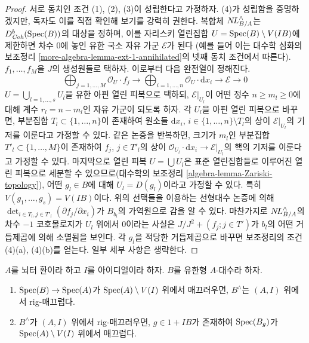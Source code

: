 \begin{proof}
\medskip\noindent
서로 동치인 조건 (1), (2), (3)이 성립한다고 가정하자.
(4)가 성립함을 증명하겠지만, 독자도 이를 직접 확인해 보기를 강력히 권한다.
복합체 $\mathop{N\!L}\nolimits_{B/A}^\wedge$는 $D^b_{\textit{Coh}}(\mathop{\mathrm{Spec}}(B))$의 대상을 정하며,
이를 자리스키 열린집합 $U = \mathop{\mathrm{Spec}}(B) \setminus V(IB)$에 제한하면
차수 $0$에 놓인 유한 국소 자유 가군 $\mathcal{E}$가 된다
(예를 들어 이는 대수학 심화의 보조정리
\ref{more-algebra-lemma-ext-1-annihilated}의 넷째 동치 조건에서 따른다).
$f_1, \ldots, f_M$을 $J$의 생성원들로 택하자. 이로부터 다음 완전열이 정해진다.
$$
\bigoplus\nolimits_{j = 1, \ldots, M} \mathcal{O}_U \cdot f_j \to
\bigoplus\nolimits_{i = 1, \ldots, n} \mathcal{O}_U \cdot \text{d}x_i \to
\mathcal{E} \to 0
$$
$U = \bigcup_{l = 1, \ldots, s} U_l$을 유한 아핀 열린 피복으로 택하되,
$\mathcal{E}|_{U_l}$이 어떤 정수 $n \geq m_l \geq 0$에 대해
계수 $r_l = n - m_l$인 자유 가군이 되도록 하자.
각 $U_l$을 아핀 열린 피복으로 바꾸면, 부분집합
$T_l \subset \{1, \ldots, n\}$이 존재하여 원소들
$\text{d}x_i$, $i \in \{1, \ldots, n\} \setminus T_l$의 상이
$\mathcal{E}|_{U_l}$의 기저를 이룬다고 가정할 수 있다.
같은 논증을 반복하면, 크기가 $m_l$인 부분집합
$T'_l \subset \{1, \ldots, M\}$이 존재하여 $f_j$, $j \in T'_l$의 상이
$\mathcal{O}_{U_l} \cdot \text{d}x_i \to \mathcal{E}|_{U_l}$의 핵의 기저를 이룬다고 가정할 수 있다.
마지막으로 열린 피복 $U = \bigcup U_l$은 표준 열린집합들로 이루어진 열린 피복으로
세분할 수 있으므로(대수학의 보조정리 \ref{algebra-lemma-Zariski-topology}),
어떤 $g_l \in B$에 대해 $U_l = D(g_l)$이라고 가정할 수 있다.
특히 $V(g_1, \ldots, g_s) = V(IB)$이다.
위의 선택들을 이용하는 선형대수 논증에 의해
$\det_{i \in T_l, j \in T'_l}(\partial f_j/ \partial x_i)$가
$B_{b_l}$의 가역원으로 감을 알 수 있다.
마찬가지로 $\mathop{N\!L}\nolimits_{B/A}^\wedge$의 차수 $-1$ 코호몰로지가 $U_l$ 위에서 0이라는 사실은
$J/J^2 + (f_j; j \in T')$가 $b_l$의 어떤 거듭제곱에 의해 소멸됨을 보인다.
각 $g_l$을 적당한 거듭제곱으로 바꾸면 보조정리의 조건 (4)(a), (4)(b)를 얻는다.
일부 세부 사항은 생략한다.
\end{proof}

\begin{lemma}
\label{lemma-rig-smooth}
$A$를 뇌터 환이라 하고 $I$를 아이디얼이라 하자.
$B$를 유한형 $A$-대수라 하자.
\begin{enumerate}
\item $\mathop{\mathrm{Spec}}(B) \to \mathop{\mathrm{Spec}}(A)$가 $\mathop{\mathrm{Spec}}(A) \setminus V(I)$ 위에서 매끄러우면,
$B^\wedge$는 $(A, I)$ 위에서 rig-매끄럽다.
\item $B^\wedge$가 $(A, I)$ 위에서 rig-매끄러우면,
$g \in 1 + IB$가 존재하여 $\mathop{\mathrm{Spec}}(B_g)$가
$\mathop{\mathrm{Spec}}(A) \setminus V(I)$ 위에서 매끄럽다.
\end{enumerate}
\end{lemma}

